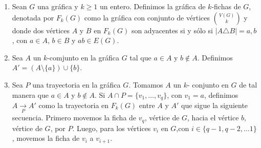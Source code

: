 \begin{definicion}
    \begin{enumerate}
        \item Sean $G$ una gr\'afica y $k \geq 1$ un entero. Definimos la
        gr\'afica de $k$-fichas de $G$, denotada por $F_k(G)$ como la
        gr\'afica con conjunto de v\'ertices $\binom{V(G)}{k}$ y donde dos
        v\'ertices $A$ y $B$ en $F_k(G)$ son adyacentes si y s\'olo si $|A
        \triangle B| ={a,b}$, con $a \in A$, $b \in B$ y $ab \in E(G)$.
        \item Sea $A$ un $k$-comjunto en la gr\'afica $G$ tal que $a \in A$
        y $b\notin A$. Definimos $A'= (A \setminus \{a\}) \cup \{b\}$.
        \item Sea $P$ una trayectoria en la gr\'afica $G$. Tomamos $A$ un
        $k$- conjunto en $G$ de tal manera que $a\in A$ y $b \notin A$. Si
        $A\cap P =\{v_1, \dots, v_q\}$, con $v_1 = a$, definimos $A
        \xrightarrow[P]{} A'$ como la trayectoria en $F_k(G)$ entre $A$ y
        $A'$ que sigue la siguiente secuencia. Primero movemos la ficha de
        $v_q$, v\'ertice de $G$, hacia el v\'ertice $b$, v\'ertice de $G$,
        por $P$. Luego, para los v\'ertices $v_i$ en $G$,con $i \in \{q-1,
        q-2, \dots 1\}$, movemos la ficha de $v_i$ a $v_{i+1}$. 
    \end{enumerate}
\end{definicion}
